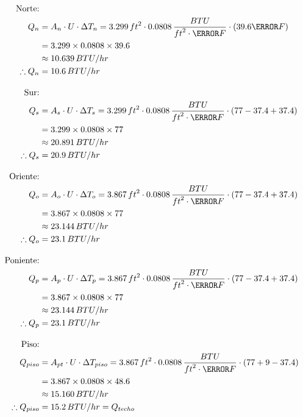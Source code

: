 \begin{equation}
	\begin{aligned}
		\text{Norte:}&\\ 
		Q_n &= A_n \cdot U \cdot \Delta T_n = 3.299 \, {ft}^2 \cdot 0.0808 \, \frac{{{BTU}}}{{{ft}^2 \cdot \degree F}} \cdot (39.6 \degree F) \\
		& = 3.299 \times 0.0808 \times 39.6 \\
		& \approx 10.639\, {BTU/hr} \\ 
		\therefore Q_n &= 10.6 \, {BTU/hr} \\[1em]
		\text{Sur:}&\\
		Q_s &= A_s \cdot U \cdot \Delta T_s = 3.299 \, {ft}^2 \cdot 0.0808 \, \frac{{{BTU}}}{{{ft}^2 \cdot \degree F}} \cdot (77 - 37.4 + 37.4) \\
		& = 3.299 \times 0.0808 \times 77 \\
		& \approx 20.891\, {BTU/hr} \\ 
		\therefore Q_s &= 20.9 \, {BTU/hr} \\[1em]
		\text{Oriente:}&\\
		Q_o &= A_o \cdot U \cdot \Delta T_o = 3.867 \, {ft}^2 \cdot 0.0808 \, \frac{{{BTU}}}{{{ft}^2 \cdot \degree F}} \cdot (77 - 37.4 + 37.4) \\
		& = 3.867 \times 0.0808 \times 77 \\
		& \approx 23.144\, {BTU/hr} \\ 
		\therefore Q_o &= 23.1 \, {BTU/hr} \\[1em]
		\text{Poniente:}&\\
		Q_p &= A_p \cdot U \cdot \Delta T_p = 3.867 \, {ft}^2 \cdot 0.0808 \, \frac{{{BTU}}}{{{ft}^2 \cdot \degree F}} \cdot (77 - 37.4 + 37.4) \\
		& = 3.867 \times 0.0808 \times 77 \\
		& \approx 23.144\, {BTU/hr} \\ 
		\therefore Q_p &= 23.1 \, {BTU/hr} \\[1em]
		\text{Piso:}&\\
		Q_{piso} &= A_{pt} \cdot U \cdot \Delta T_{piso} = 3.867 \, {ft}^2 \cdot 0.0808 \, \frac{{{BTU}}}{{{ft}^2 \cdot \degree F}} \cdot (77 + 9 - 37.4) \\
		& = 3.867 \times 0.0808 \times 48.6 \\
		& \approx 15.160\, {BTU/hr} \\ 
		\therefore Q_{piso} &= 15.2 \, {BTU/hr}  =Q_{techo}
	\end{aligned}
\end{equation}



